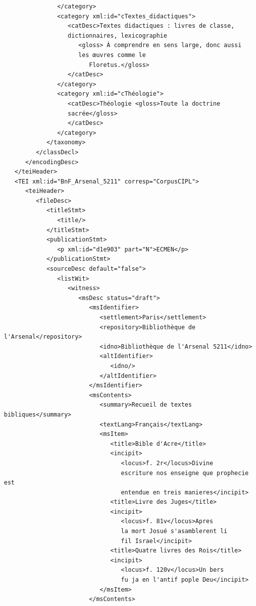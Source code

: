 \documentclass[a4paper,12pt,twoside]{book}
\begin{document}
\begin{verbatim}
               </category>
               <category xml:id="cTextes_didactiques">
                  <catDesc>Textes didactiques : livres de classe, 
                  dictionnaires, lexicographie
                     <gloss> À comprendre en sens large, donc aussi 
                     les œuvres comme le
                        Floretus.</gloss>
                  </catDesc>
               </category>
               <category xml:id="cThéologie">
                  <catDesc>Théologie <gloss>Toute la doctrine 
                  sacrée</gloss>
                  </catDesc>
               </category>
            </taxonomy>
         </classDecl>
      </encodingDesc>
   </teiHeader>
   <TEI xml:id="BnF_Arsenal_5211" corresp="CorpusCIPL">
      <teiHeader>
         <fileDesc>
            <titleStmt>
               <title/>
            </titleStmt>
            <publicationStmt>
               <p xml:id="d1e903" part="N">ECMEN</p>
            </publicationStmt>
            <sourceDesc default="false">
               <listWit>
                  <witness>
                     <msDesc status="draft">
                        <msIdentifier>
                           <settlement>Paris</settlement>
                           <repository>Bibliothèque de l'Arsenal</repository>
                           <idno>Bibliothèque de l'Arsenal 5211</idno>
                           <altIdentifier>
                              <idno/>
                           </altIdentifier>
                        </msIdentifier>
                        <msContents>
                           <summary>Recueil de textes bibliques</summary>
                           <textLang>Français</textLang>
                           <msItem>
                              <title>Bible d'Acre</title>
                              <incipit>
                                 <locus>f. 2r</locus>Divine 
                                 escriture nos enseigne que prophecie est 
                                 entendue en treis manieres</incipit>
                              <title>Livre des Juges</title>
                              <incipit>
                                 <locus>f. 81v</locus>Apres 
                                 la mort Josué s'asamblerent li 
                                 fil Israel</incipit>
                              <title>Quatre livres des Rois</title>
                              <incipit>
                                 <locus>f. 120v</locus>Un bers 
                                 fu ja en l'antif pople Deu</incipit>
                           </msItem>
                        </msContents>

\end{verbatim}
\end{document}
